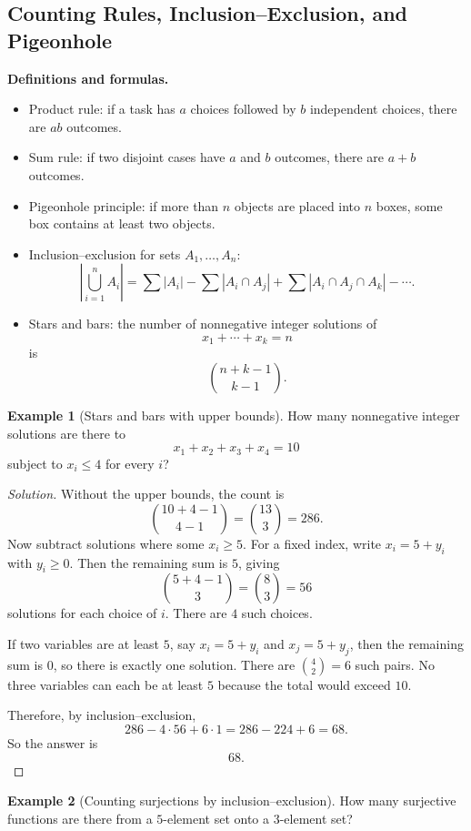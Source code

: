 \documentclass[11pt]{article}
\theoremstyle{definition}
\newtheorem{example}{Example}[section]
\begin{document}
\subsection{Counting Rules, Inclusion--Exclusion, and Pigeonhole}
\textbf{Definitions and formulas.}
\begin{itemize}
    \item Product rule: if a task has $a$ choices followed by $b$ independent choices, there are $ab$ outcomes.
    \item Sum rule: if two disjoint cases have $a$ and $b$ outcomes, there are $a+b$ outcomes.
    \item Pigeonhole principle: if more than $n$ objects are placed into $n$ boxes, some box contains at least two objects.
    \item Inclusion--exclusion for sets $A_1,\dots,A_n$:
    \[
        \left|\bigcup_{i=1}^n A_i\right|
        = \sum |A_i| - \sum |A_i\cap A_j| + \sum |A_i\cap A_j\cap A_k| - \cdots.
    \]
    \item Stars and bars: the number of nonnegative integer solutions of
    \[
        x_1+\cdots+x_k=n
    \]
    is
    \[
        \binom{n+k-1}{k-1}.
    \]
\end{itemize}

\begin{example}[Stars and bars with upper bounds]
How many nonnegative integer solutions are there to
\[
x_1+x_2+x_3+x_4=10
\]
subject to $x_i\le 4$ for every $i$?
\end{example}

\begin{proof}[Solution]
Without the upper bounds, the count is
\[
\binom{10+4-1}{4-1}=\binom{13}{3}=286.
\]
Now subtract solutions where some $x_i\ge 5$. For a fixed index, write $x_i=5+y_i$ with $y_i\ge 0$. Then the remaining sum is $5$, giving
\[
\binom{5+4-1}{3}=\binom{8}{3}=56
\]
solutions for each choice of $i$. There are $4$ such choices.

If two variables are at least $5$, say $x_i=5+y_i$ and $x_j=5+y_j$, then the remaining sum is $0$, so there is exactly one solution. There are $\binom{4}{2}=6$ such pairs. No three variables can each be at least $5$ because the total would exceed $10$.

Therefore, by inclusion--exclusion,
\[
286 - 4\cdot 56 + 6\cdot 1 = 286 - 224 + 6 = 68.
\]
So the answer is
\[
\boxed{68}.
\]
\end{proof}

\begin{example}[Counting surjections by inclusion--exclusion]
How many surjective functions are there from a $5$-element set onto a $3$-element set?
\end{example}
\end{document}
